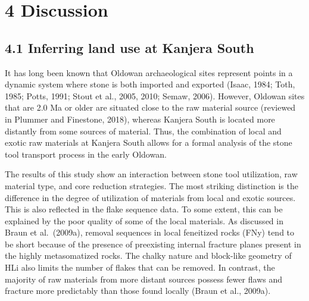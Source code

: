 \documentclass[]{elsarticle} %
\begin{document}
\hypertarget{discussion}{%
\section{4 Discussion}\label{discussion}}

\hypertarget{inferring-land-use-at-kanjera-south}{%
\subsection{4.1 Inferring land use at Kanjera
South}\label{inferring-land-use-at-kanjera-south}}

It has long been known that Oldowan archaeological sites represent
points in a dynamic system where stone is both imported and exported
(\hspace{0pt}Isaac, 1984\hspace{0pt}; \hspace{0pt}Toth,
1985\hspace{0pt}; \hspace{0pt}Potts, 1991\hspace{0pt}; \hspace{0pt}Stout
et al., 2005\hspace{0pt}, \hspace{0pt}2010\hspace{0pt};
\hspace{0pt}Semaw, 2006\hspace{0pt}). However, Oldowan sites that are
2.0 Ma or older are situated close to the raw material source (reviewed
in \hspace{0pt}Plummer and Finestone, 2018\hspace{0pt}), whereas Kanjera
South is located more distantly from some sources of material. Thus, the
combination of local and exotic raw materials at Kanjera South allows
for a formal analysis of the stone tool transport process in the early
Oldowan.

The results of this study show an interaction between stone tool
utilization, raw material type, and core reduction strategies. The most
striking distinction is the difference in the degree of utilization of
materials from local and exotic sources. This is also reflected in the
flake sequence data. To some extent, this can be explained by the poor
quality of some of the local materials. As discussed in
\hspace{0pt}Braun et al.~(2009a)\hspace{0pt}, removal sequences in local
feneitized rocks (FNy) tend to be short because of the presence of
preexisting internal fracture planes present in the highly metasomatized
rocks. The chalky nature and block-like geometry of HLi also limits the
number of flakes that can be removed. In contrast, the majority of raw
materials from more distant sources possess fewer flaws and fracture
more predictably than those found locally (\hspace{0pt}Braun et al.,
2009a\hspace{0pt}).
\end{document}
